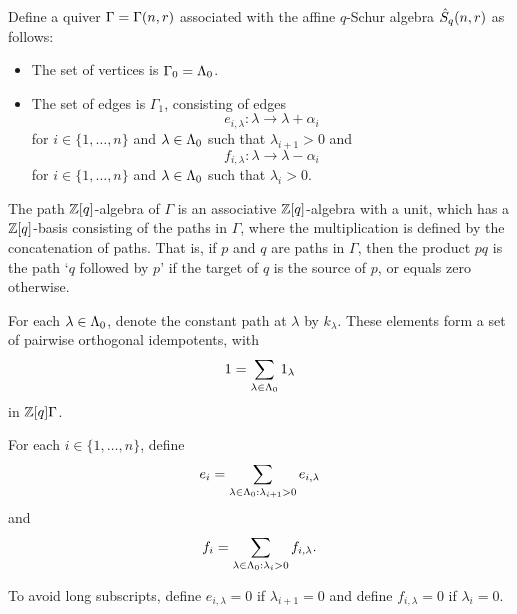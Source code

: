 \documentclass[a4paper, 11pt]{report}
\begin{document}
Define a quiver $\Gamma=\Gamma(n,r)$ associated with the affine $q$-Schur algebra $\hat{S}_q(n,r)$ as follows:
\begin{itemize}
\item
The set of vertices is $\Gamma_0=\Lambda_0{}$.
\item
The set of edges is $\Gamma_1$, consisting of edges
\begin{equation*}
e_{i,\lambda}\colon \lambda\to\lambda+\alpha_i
\end{equation*}
for $i\in\{1,\ldots,n\}$ and $\lambda\in\Lambda_0{}$ such that $\lambda_{i+1}>0$ and
\begin{equation*}
f_{i,\lambda}\colon \lambda\to\lambda-\alpha_i
\end{equation*}
for $i\in\{1,\ldots,n\}$ and $\lambda\in\Lambda_0{}$ such that $\lambda_i>0$. 
\end{itemize}

The path $\mathbb{Z}[q]$-algebra of $\Gamma$ is an associative $\mathbb{Z}[q]$-algebra with a unit, which has a $\mathbb{Z}[q]$-basis consisting of the paths in $\Gamma$, where the multiplication is defined by the concatenation of paths. That is, if $p$ and $q$ are paths in $\Gamma$, then the product $pq$ is the path `$q$ followed by $p$' if the target of $q$ is the source of $p$, or equals zero otherwise. 

For each $\lambda\in\Lambda_0{}$, denote the constant path at $\lambda$ by $k_\lambda$. These elements form a set of pairwise orthogonal idempotents, with
\begin{equation*}
1 = \sum_{\lambda\in\Lambda_0{}} 1_\lambda
\end{equation*}
in $\mathbb{Z}[q]\Gamma$.

For each $i\in\{1,\ldots,n\}$, define
\begin{equation*}
e_i = \sum_{\lambda\in\Lambda_0{}:\lambda_{i+1}>0} e_{i,\lambda}
\end{equation*}
and
\begin{equation*}
f_i = \sum_{\lambda\in\Lambda_0{}: \lambda_i>0} f_{i,\lambda}.
\end{equation*}

To avoid long subscripts, define $e_{i,\lambda}=0$ if $\lambda_{i+1}=0$ and define $f_{i,\lambda}=0$ if $\lambda_i=0$.
\end{document}
